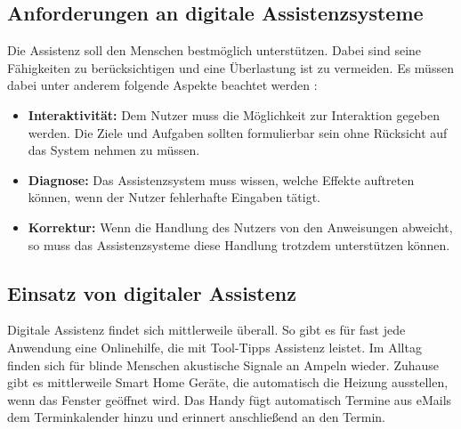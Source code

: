 \subsection{Anforderungen an digitale Assistenzsysteme}
Die Assistenz soll den Menschen bestmöglich unterstützen. Dabei sind seine Fähigkeiten zu berücksichtigen und eine Überlastung ist zu vermeiden. Es müssen dabei unter anderem folgende Aspekte beachtet werden \cite{Ludwig}:
\begin{itemize}
\item \textbf{Interaktivität:} Dem Nutzer muss die Möglichkeit zur Interaktion gegeben werden. Die Ziele und Aufgaben sollten formulierbar sein ohne Rücksicht auf das System nehmen zu müssen.
\item \textbf{Diagnose:} Das Assistenzsystem muss wissen, welche Effekte auftreten können, wenn der Nutzer fehlerhafte Eingaben tätigt.
\item \textbf{Korrektur:} Wenn die Handlung des Nutzers von den Anweisungen abweicht, so muss das Assistenzsysteme diese Handlung trotzdem unterstützen können.
\end{itemize}

\subsection{Einsatz von digitaler Assistenz}
\label{2:Einsatz-Assistenz}
Digitale Assistenz findet sich mittlerweile überall. So gibt es für fast jede Anwendung eine Onlinehilfe, die mit Tool-Tipps Assistenz leistet. Im Alltag finden sich für blinde Menschen akustische Signale an Ampeln wieder. Zuhause gibt es mittlerweile Smart Home Geräte, die automatisch die Heizung ausstellen, wenn das Fenster geöffnet wird. Das Handy fügt automatisch Termine aus eMails dem Terminkalender hinzu und erinnert anschließend an den Termin.

